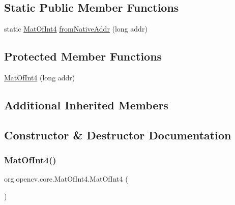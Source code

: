 \subsection*{Static Public Member Functions}
\begin{DoxyCompactItemize}
\item 
static \mbox{\hyperlink{classorg_1_1opencv_1_1core_1_1_mat_of_int4}{Mat\+Of\+Int4}} \mbox{\hyperlink{classorg_1_1opencv_1_1core_1_1_mat_of_int4_a84471cfa58d65277d80075b8d320036b}{from\+Native\+Addr}} (long addr)
\end{DoxyCompactItemize}
\subsection*{Protected Member Functions}
\begin{DoxyCompactItemize}
\item 
\mbox{\hyperlink{classorg_1_1opencv_1_1core_1_1_mat_of_int4_a7c92848a6075f1b8c57e92a1825792e1}{Mat\+Of\+Int4}} (long addr)
\end{DoxyCompactItemize}
\subsection*{Additional Inherited Members}


\subsection{Constructor \& Destructor Documentation}
\mbox{\label{classorg_1_1opencv_1_1core_1_1_mat_of_int4_a275fe3edf9507fb598dd475766dc02b1}} 
\subsubsection{\texorpdfstring{Mat\+Of\+Int4()}{MatOfInt4()}\hspace{0.1cm}{\footnotesize\ttfamily [1/4]}}
{\footnotesize\ttfamily org.\+opencv.\+core.\+Mat\+Of\+Int4.\+Mat\+Of\+Int4 (\begin{DoxyParamCaption}{ }\end{DoxyParamCaption})}

\mbox{\label{classorg_1_1opencv_1_1core_1_1_mat_of_int4_a7c92848a6075f1b8c57e92a1825792e1}} 
